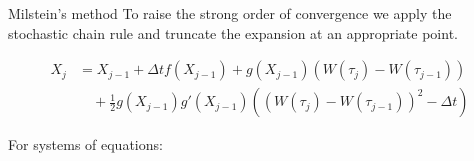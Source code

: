 \documentclass[10pt,a4paper]{beamer}
\begin{document}
\begin{frame}{Milstein's method}
To raise the strong order of convergence we apply the stochastic chain rule and truncate the expansion at an appropriate point. 	

\begin{equation*}
\begin{split}
X_{j} & =X_{j-1}+\Delta t f(X_{j-1})+g(X_{j-1})(W(\tau_j)-W(\tau_{j-1}))\\
	  &\quad +\frac{1}{2}g(X_{j-1})g'(X_{j-1})((W(\tau_j)-W(\tau_{j-1}))^2-\Delta t)
\end{split}
\end{equation*}

\end{frame}

\begin{frame}
For systems of equations:

\end{frame}
\end{document}
